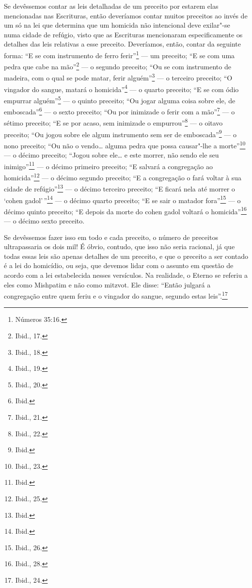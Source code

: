 Se devêssemos contar as leis detalhadas de um preceito por estarem elas
mencionadas nas Escrituras, então deveríamos contar muitos preceitos ao
invés de um só na lei que determina que um homicida não intencional deve
exilar"-se numa cidade de refúgio, visto que as Escrituras mencionaram
especificamente os detalhes das leis relativas a esse preceito.
Deveríamos, então, contar da seguinte forma: ``E se com instrumento de
ferro ferir''\footnote{Números 35:16.} --- um preceito; ``E se com uma pedra que
cabe na mão''\footnote{Ibid., 17.} --- o segundo preceito; ``Ou se com
instrumento de madeira, com o qual se pode matar, ferir alguém''\footnote{Ibid.,
18.} --- o terceiro preceito; ``O vingador do sangue, matará o homicida''\footnote{Ibid., 19.} --- o quarto preceito; ``E se com ódio empurrar alguém''\footnote{Ibid., 20.} --- o quinto preceito; ``Ou jogar alguma coisa sobre ele, de
emboscada''\footnote{Ibid.} --- o sexto preceito; ``Ou por inimizade o ferir
com a mão''\footnote{Ibid., 21.} --- o sétimo preceito; ``E se por acaso, sem inimizade o empurrou''\footnote{Ibid., 22.} --- o oitavo preceito; ``Ou jogou sobre ele algum instrumento sem ser  de emboscada''\footnote{Ibid.} --- o nono preceito; ``Ou não o vendo\ldots{} alguma
  pedra que possa causar"-lhe a morte''\footnote{Ibid., 23.} --- o décimo
  preceito; ``Jogou sobre ele\ldots{} e este morrer, não sendo ele seu
  inimigo''\footnote{Ibid.} --- o décimo primeiro preceito; ``E salvará a
  congregação ao homicida''\footnote{Ibid., 25.} --- o décimo segundo preceito;
  ``E a congregação o fará voltar à sua cidade de refúgio''\footnote{Ibid.} ---
  o décimo terceiro preceito; ``E ficará nela até morrer o `cohen
  gadol\starr'\,''\footnote{Ibid.} --- o décimo quarto preceito; ``E se sair o matador fora''\footnote{Ibid., 26.} --- o décimo quinto preceito; ``E depois da morte do cohen gadol\starr{} voltará o homicida''\footnote{Ibid., 28.} --- o décimo sexto preceito.

Se devêssemos fazer isso em todo e cada preceito, o número de preceitos
ultrapassaria os dois mil! É óbvio, contudo, que isso não seria
racional, já que todas essas leis são apenas detalhes de um preceito, e
que o preceito a ser contado é a lei do homicídio, ou seja, que devemos
lidar com o assunto em questão de acordo com a lei estabelecida nesses
versículos. Na realidade, o Eterno se referiu a eles como Mishpatim\starr{}
e não como mitzvot\starr. Ele disse: ``Então julgará a
congregação entre quem feriu e o vingador do sangue, segundo estas
leis''.\footnote{Ibid., 24.}

